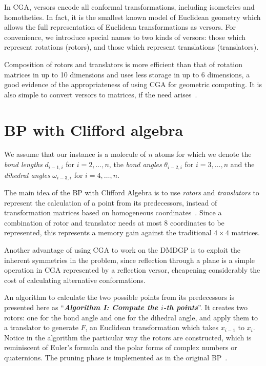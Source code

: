 \documentclass{proc}
\begin{document}
In CGA, versors encode all conformal transformations, including isometries and homotheties. In fact, it is the smallest known model of Euclidean geometry which allows the full representation of Euclidean transformations as versors. For convenience, we introduce special names to two kinds of versors: those which represent rotations (rotors), and those which represent translations (translators).

Composition of rotors and translators is more efficient than that of rotation matrices in up to 10 dimensions and uses less storage in up to 6 dimensions, a good evidence of the appropriateness of using CGA for geometric computing. It is also simple to convert versors to matrices, if the need arises~\cite{Dorst2007}.









\section{BP with Clifford algebra}
We assume that our instance is a molecule of $n$ atoms for which we denote the \textit{bond lengths} $d_{i-1, i}$ for $i = 2, \dots, n$, the \textit{bond angles} $\theta_{i-2, i}$ for $i = 3, \dots, n$ and the \textit{dihedral angles} $\omega_{i-3, i}$ for $i = 4, \dots, n$.

The main idea of the BP with Clifford Algebra is to use \textit{rotors} and \textit{translators} to represent the calculation of a point from its predecessors, instead of transformation matrices based on homogeneous coordinates~\cite{dmdgp}. Since a combination of rotor and translator needs at most 8 coordinates to be represented, this represents a memory gain against the traditional $4 \times 4$ matrices.


Another advantage of using CGA to work on the DMDGP is to exploit the inherent symmetries in the problem, since reflection through a plane is a simple operation in CGA represented by a reflection versor, cheapening considerably the cost of calculating alternative conformations.

An algorithm to calculate the two possible points from its predecessors is presented here as ``\textit{\textbf{Algorithm I: Compute the $i$-th points}}''. It creates two rotors: one for the bond angle and one for the dihedral angle, and apply them to a translator to generate $F$, an Euclidean transformation which takes $x_{i-1}$ to $x_i$. Notice in the algorithm the particular way the rotors are constructed, which is reminiscent of Euler's formula and the polar forms of complex numbers or quaternions.
The pruning phase is implemented as in the original BP~\cite{survey}.
\end{document}
